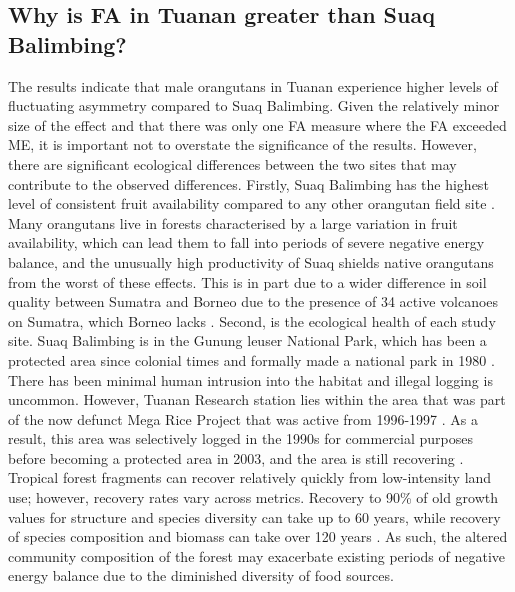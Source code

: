 \subsection{Why is FA in Tuanan greater than Suaq Balimbing?}
The results indicate that male orangutans in Tuanan experience higher levels of fluctuating asymmetry compared to Suaq Balimbing. Given the relatively minor size of the effect and that there was only one FA measure where the FA exceeded ME, it is important not to overstate the significance of the results. However, there are significant ecological differences between the two sites that may contribute to the observed differences. 
Firstly, Suaq Balimbing has the highest level of consistent fruit availability compared to any other orangutan field site \citep{Singleton.2001}. Many orangutans live in forests characterised by a large variation in fruit availability, which can lead them to fall into periods of severe negative energy balance, and the unusually high productivity of Suaq shields native orangutans from the worst of these effects. This is in part due to a wider difference in soil quality between Sumatra and Borneo due to the presence of 34 active volcanoes on Sumatra, which Borneo lacks \citep{Barber.2005}.
Second, is the ecological health of each study site. Suaq Balimbing is in the Gunung leuser National Park, which has been a protected area since colonial times and formally made a national park in 1980 \citep{Singleton.2001}. There has been minimal human intrusion into the habitat and illegal logging is uncommon. However, Tuanan Research station lies within the area that was part of the now defunct Mega Rice Project that was active from 1996-1997 \citep{Erb.2018}. As a result, this area was selectively logged in the 1990s for commercial purposes before becoming a protected area in 2003, and the area is still recovering \citep{Husson.2008}. Tropical forest fragments can recover relatively quickly from low-intensity land use; however, recovery rates vary across metrics. Recovery to 90\% of old growth values for structure and species diversity can take up to 60 years, while recovery of species composition and biomass can take over 120 years \citep{Poorter.2021}. As such, the altered community composition of the forest may exacerbate existing periods of negative energy balance due to the diminished diversity of food sources. 
